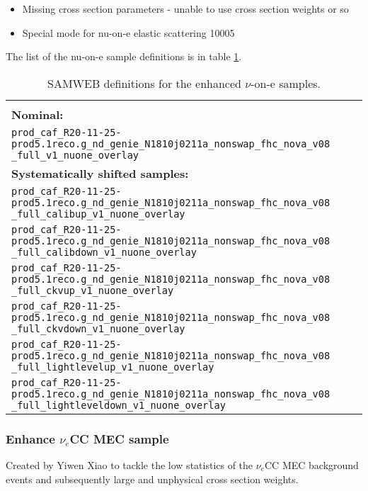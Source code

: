 \begin{itemize}
\item Missing cross section parameters - unable to use cross section weights or so
\item Special mode for nu-on-e elastic scattering 10005
\end{itemize}

The list of the nu-on-e sample definitions is in table \ref{tab:NuoneDefinitions}.

\begin{table}[!ht]
\centering
\caption{SAMWEB definitions for the enhanced $\nu$-on-e samples.}
\begin{tabular}{p{\textwidth}}
\hline\hline\\[-2mm]
\textbf{Nominal:}\\
\texttt{prod\_caf\_R20-11-25-prod5.1reco.g\_nd\_genie\_N1810j0211a\_nonswap\_fhc\_nova\_v08} \texttt{\_full\_v1\_nuone\_overlay}\\[7mm]
\textbf{Systematically shifted samples:}\\
\texttt{prod\_caf\_R20-11-25-prod5.1reco.g\_nd\_genie\_N1810j0211a\_nonswap\_fhc\_nova\_v08} \texttt{\_full\_calibup\_v1\_nuone\_overlay}\\[7mm]
\texttt{prod\_caf\_R20-11-25-prod5.1reco.g\_nd\_genie\_N1810j0211a\_nonswap\_fhc\_nova\_v08} \texttt{\_full\_calibdown\_v1\_nuone\_overlay}\\[7mm]
\texttt{prod\_caf\_R20-11-25-prod5.1reco.g\_nd\_genie\_N1810j0211a\_nonswap\_fhc\_nova\_v08} \texttt{\_full\_ckvup\_v1\_nuone\_overlay}\\[7mm]
\texttt{prod\_caf\_R20-11-25-prod5.1reco.g\_nd\_genie\_N1810j0211a\_nonswap\_fhc\_nova\_v08} \texttt{\_full\_ckvdown\_v1\_nuone\_overlay}\\[7mm]
\texttt{prod\_caf\_R20-11-25-prod5.1reco.g\_nd\_genie\_N1810j0211a\_nonswap\_fhc\_nova\_v08} \texttt{\_full\_lightlevelup\_v1\_nuone\_overlay}\\[7mm]
\texttt{prod\_caf\_R20-11-25-prod5.1reco.g\_nd\_genie\_N1810j0211a\_nonswap\_fhc\_nova\_v08} \texttt{\_full\_lightleveldown\_v1\_nuone\_overlay}\\[7mm]
\hline\hline
\end{tabular}
\label{tab:NuoneDefinitions}
\end{table}

\subsubsection*{Enhance $\nu_e$CC MEC sample}
Created by Yiwen Xiao \cite{NOVA-doc-56383} to tackle the low statistics of the $\nu_e$CC MEC background events and subsequently large and unphysical cross section weights.

